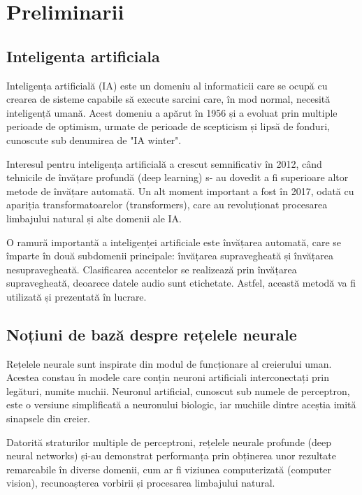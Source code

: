 
\chapter{Preliminarii}

\section{Inteligenta artificiala}

Inteligența artificială (IA) este un domeniu al informaticii care se ocupă cu crearea de sisteme capabile să execute sarcini 
care, în mod normal, necesită inteligență umană. Acest domeniu a apărut în 1956 și a evoluat prin multiple perioade de 
optimism, urmate de perioade de scepticism și lipsă de fonduri, cunoscute sub denumirea de "IA winter".

Interesul pentru inteligența artificială a crescut semnificativ în 2012, când tehnicile de învățare profundă (deep learning) s-
au dovedit a fi superioare altor metode de învățare automată. Un alt moment important a fost în 2017, odată cu apariția 
transformatoarelor (transformers), care au revoluționat procesarea limbajului natural și alte domenii ale IA.

O ramură importantă a inteligenței artificiale este învățarea automată, care se împarte în două subdomenii principale: 
învățarea supravegheată și învățarea nesupravegheată. Clasificarea accentelor se realizează prin învățarea supravegheată, 
deoarece datele audio sunt etichetate. Astfel, această metodă va fi utilizată și prezentată în lucrare.


\section{Noțiuni de bază despre rețelele neurale}

Rețelele neurale sunt inspirate din modul de funcționare al creierului uman. Acestea constau în modele care conțin neuroni 
artificiali interconectați prin legături, numite muchii. Neuronul artificial, cunoscut sub numele de perceptron, este o 
versiune simplificată a neuronului biologic, iar muchiile dintre aceștia imită sinapsele din creier.

Datorită straturilor multiple de perceptroni, rețelele neurale profunde (deep neural networks) și-au demonstrat performanța 
prin obținerea unor rezultate remarcabile în diverse domenii, cum ar fi viziunea computerizată (computer vision), 
recunoașterea vorbirii și procesarea limbajului natural.

